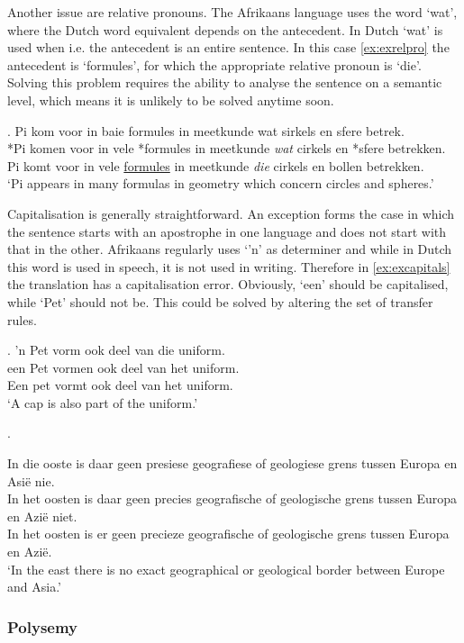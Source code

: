 \documentclass[11pt]{article}
\begin{document}
Another issue are relative pronouns. The Afrikaans language uses the word `wat', where the
Dutch word equivalent depends on the antecedent. In Dutch `wat' is used when i.e. the antecedent
is an entire sentence. In this case \ref{ex:exrelpro} the antecedent is `formules', for which the appropriate
relative pronoun is `die'. Solving this problem requires the ability to analyse the
sentence on a semantic level, which means it is unlikely to be solved anytime soon.

\ex. \label{ex:exrelpro}
    Pi kom voor in baie formules in meetkunde wat sirkels en sfere betrek. \\
    *Pi komen voor in vele *formules in meetkunde {\em wat} cirkels en *sfere betrekken. \\
    Pi komt voor in vele \underline{formules} in meetkunde {\em die} cirkels en bollen betrekken. \\
    `Pi appears in many formulas in geometry which concern circles and spheres.' 

Capitalisation is generally straightforward. An exception forms the case in which the sentence
starts with an apostrophe in one language and does not start with that in the other. Afrikaans
regularly uses `'n' as determiner and while in Dutch this word is used in speech, it is not used in writing.
Therefore in \ref{ex:excapitals} the translation has a capitalisation error. Obviously, `een' should be
capitalised, while `Pet' should not be. This could be solved by altering the set of transfer rules.

\ex. \label{ex:excapitals} 
    'n Pet vorm ook deel van die uniform. \\
    een Pet vormen ook deel van het uniform. \\
    Een pet vormt ook deel van het uniform. \\
    `A cap is also part of the uniform.' 


\ex. \label{ex:chunking}

    In die ooste is daar geen presiese geografiese of geologiese grens tussen Europa en Asië nie. \\
    In het oosten is daar geen precies geografische of geologische grens tussen Europa en Azië niet. \\ 
    In het oosten is er geen precieze geografische of geologische grens tussen Europa en Azië. \\
    `In the east there is no exact geographical or geological border between Europe and Asia.' 

\subsubsection{Polysemy}
\end{document}
